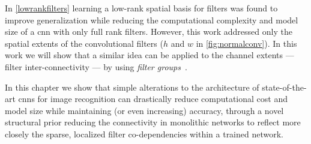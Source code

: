 \documentclass[thesis]{subfiles}
\begin{document}
	In \cref{lowrankfilters} learning a low-rank spatial basis for filters was found to improve generalization while reducing the computational complexity and model size of a \gls{cnn} with only full rank filters. However, this work addressed only the spatial extents of the convolutional filters (\ie $h$ and $w$ in \cref{fig:normalconv}). In this work we will show that a similar idea can be applied to the channel extents --- \ie filter inter-connectivity --- by using \emph{filter groups}~\citep{Krizhevsky2012}. 
	
	
	
	
	In this chapter we show that simple alterations to the architecture of state-of-the-art \glspl{cnn} for image recognition can drastically reduce computational cost and model size while maintaining (or even increasing) accuracy, through a novel structural prior reducing the connectivity in monolithic networks to reflect more closely the sparse, localized filter co-dependencies within a trained network.
	
\end{document}
